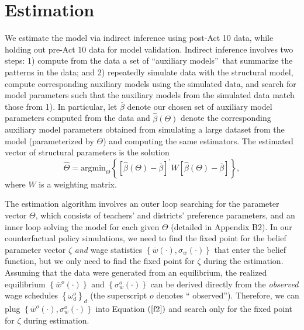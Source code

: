 \documentclass[notitlepage,12pt]{article}%
\begin{document}
\section{Estimation}

We estimate the model via indirect inference using post-Act 10 data, while
holding out pre-Act 10 data for model validation. Indirect inference involves
two steps: 1) compute from the data a set of \textquotedblleft auxiliary
models\textquotedblright\ that summarize the patterns in the data; and 2)
repeatedly simulate data with the structural model, compute corresponding
auxiliary models using the simulated data, and search for model parameters
such that the auxiliary models from the simulated data match those from 1). In
particular, let $\overline{\beta}$ denote our chosen set of auxiliary model
parameters computed from the data and $\widehat{\beta}(\Theta)$ denote the
corresponding auxiliary model parameters obtained from simulating a large
dataset from the model (parameterized by $\Theta$) and computing the same
estimators. The estimated vector of structural parameters is the solution
\[
\widehat{\Theta}=\text{argmin}_{\Theta}\left\{  [\widehat{\beta}%
(\Theta)-\overline{\beta}]^{\prime}W[\widehat{\beta}(\Theta)-\overline{\beta
}]\right\}  ,
\]
where $W$ is a weighting matrix.

The estimation algorithm involves an outer loop searching for the parameter
vector $\Theta$, which consists of teachers' and districts' preference
parameters, and an inner loop solving the model for each given $\Theta$
(detailed in Appendix B2). In our counterfactual policy simulations, we
need to find the fixed point for the belief parameter vector $\zeta$
\emph{and} wage statistics $\left\{  \overline{w}\left(  \cdot\right)
,\sigma_{w}\left(  \cdot\right)  \right\}  $ that enter the belief function,
but we only need to find the fixed point for $\zeta$ during the estimation.
Assuming that the data were generated from an equilibrium, the realized
equilibrium $\left\{  \overline{w}^{o}\left(  \cdot\right)  \right\}  $ and
$\left\{  \sigma_{w}^{o}\left(  \cdot\right)  \right\}  $ can be derived
directly from the \emph{observed }wage schedules $\left\{  \omega_{d}%
^{o}\right\}  _{d}$ (the superscript $o$ denotes \textquotedblleft
observed\textquotedblright). Therefore, we can plug $\left\{  \overline{w}%
^{o}\left(  \cdot\right)  ,\sigma_{w}^{o}\left(  \cdot\right)  \right\}  $
into Equation $\left(  \ref{f2}\right)  $ and search only for the fixed point
for $\zeta$ during estimation.
\end{document}
